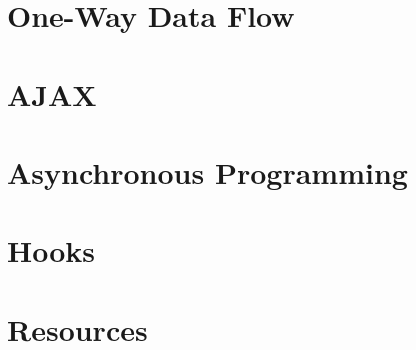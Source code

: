 \documentclass[b5paper,openany]{book}
\begin{document}
\chapter{One-Way Data Flow}




\chapter{AJAX}


\chapter{Asynchronous Programming}


\chapter{Hooks}


\chapter{Resources}






\end{document}
